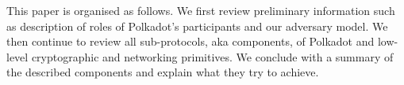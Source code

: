 This paper is organised as follows. We first review preliminary information such as description of roles of Polkadot's participants and our adversary model. We then continue to review all sub-protocols, aka components, of Polkadot and low-level cryptographic and networking primitives. We conclude with a summary of the described components and explain what they try to achieve. 





